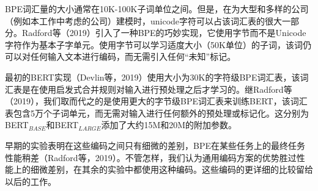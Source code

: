 \documentclass[lang=cn,11pt,a4paper,twocolumn]{elegantpaper}
\begin{document}
BPE词汇量的大小通常在10K-100K子词单位之间。但是，在为大型和多样的公司（例如本工作中考虑的公司）建模时，unicode字符可以占该词汇表的很大一部分。Radford等（2019）引入了一种BPE的巧妙实现，它使用字节而不是Unicode字符作为基本子字单元。使用字节可以学习适度大小（50K单位）的子词，该词仍可以对任何输入文本进行编码，而无需引入任何“未知”标记。

最初的BERT实现（Devlin等，2019）使用大小为30K的字符级BPE词汇表，该词汇表是在使用启发式合并规则对输入进行预处理之后才学习的。继Radford等（2019），我们取而代之的是使用更大的字节级BPE词汇表来训练BERT，该词汇表包含5万个子词单元，而无需对输入进行任何额外的预处理或标记化。这分别为BERT$_{BASE}$和BERT$_{LARGE}$添加了大约15M和20M的附加参数。

早期的实验表明在这些编码之间只有细微的差别，BPE在某些任务上的最终任务性能稍差（Radford等，2019）。不管怎样，我们认为通用编码方案的优势胜过性能上的细微差别，在其余的实验中都使用这种编码。这些编码的更详细的比较留给以后的工作。
\end{document}
